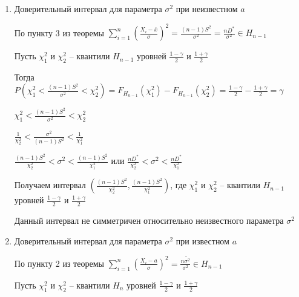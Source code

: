 \begin{enumerate}[label*=\Roman*.]
    $F_{T_{n - 1}}(t_\gamma) = \frac{1 + \gamma}{2} \Longrightarrow t_\gamma$ -- квантиль $T_{n - 1}$ уровня 
    $\frac{1 + \gamma}{2}$

    Аналогично с примером выше получаем интервал $\left(\overline{x} - t_\gamma \frac{S}{\sqrt{n}}, 
    \overline{x} + t_\gamma \frac{S}{\sqrt{n}}\right)$, 
    где $t_\gamma$ -- квантиль $T_{n - 1}$ уровня $\frac{1 + \gamma}{2}$

    \hypertarget{confidence_interval_for_sigma_unknown_a}{}

    \item Доверительный интервал для параметра $\sigma^2$ при неизвестном $a$

    По пункту 3 из теоремы $\sum_{i = 1}^n \left(\frac{X_i - \overline{x}}{\sigma}\right)^2 = \frac{(n - 1)S^2}{\sigma^2} = 
    \frac{nD^*}{\sigma^2} \in H_{n - 1}$

    Пусть $\chi_1^2$ и $\chi_2^2$ -- квантили $H_{n - 1}$ уровней $\frac{1 - \gamma}{2}$ и $\frac{1 + \gamma}{2}$

    Тогда $P\left(\chi_1^2 < \frac{(n - 1)S^2}{\sigma^2} < \chi_2^2\right) = F_{H_{n - 1}}(\chi_1^2) - F_{H_{n - 1}}(\chi_2^2) = \frac{1 - \gamma}{2} - \frac{1 + \gamma}{2} = \gamma$

    $\chi_1^2 < \frac{(n - 1)S^2}{\sigma^2} < \chi_2^2$

    $\frac{1}{\chi_2^2} < \frac{\sigma^2}{(n - 1)S^2} < \frac{1}{\chi_1^2}$

    $\frac{(n - 1)S^2}{\chi_2^2} < \sigma^2 < \frac{(n - 1)S^2}{\chi_1^2}$ или 
    $\frac{nD^*}{\chi_2^2} < \sigma^2 < \frac{nD^*}{\chi_1^2}$

    Получаем интервал $\left(\frac{(n - 1)S^2}{\chi_2^2}, \frac{(n - 1)S^2}{\chi_1^2}\right)$, где $\chi_1^2$ и $\chi_2^2$ -- квантили $H_{n - 1}$ уровней $\frac{1 - \gamma}{2}$ и $\frac{1 + \gamma}{2}$

    \Nota Данный интервал не симметричен относительно неизвестного параметра $\sigma^2$

    \hypertarget{confidence_interval_for_sigma_known_a}{}

    \item Доверительный интервал для параметра $\sigma^2$ при известном $a$

    По пункту 2 из теоремы $\sum_{i = 1}^n \left(\frac{X_i - a}{\sigma}\right)^2 = \frac{n \tilde{\sigma^2}}{\sigma^2} \in H_{n - 1}$
    
    Пусть $\chi_1^2$ и $\chi_2^2$ -- квантили $H_{n}$ уровней $\frac{1 - \gamma}{2}$ и $\frac{1 + \gamma}{2}$


\end{enumerate}
